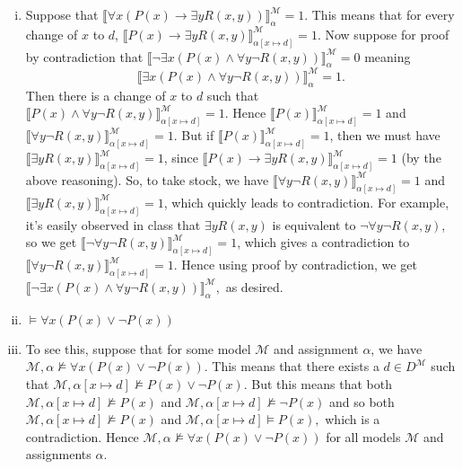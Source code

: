 \begin{enumerate}[\thesection.1]
\begin{enumerate}[(i)]
		\item[] Suppose that $\llbracket \forall x(P(x)\to \exists yR(x,y))\rrbracket^\mathcal{M}_\alpha=1$. This means that for every change of $x$ to $d$, $\llbracket P(x)\to \exists yR(x,y)\rrbracket^\mathcal{M}_{\alpha[x\mapsto d]}=1$. Now suppose for proof by contradiction that $\llbracket\neg \exists x(P(x)\land \forall y\neg R(x,y))\rrbracket^\mathcal{M}_\alpha=0$ meaning  \[\llbracket\exists x(P(x)\land \forall y\neg R(x,y))\rrbracket^\mathcal{M}_\alpha=1.\] Then there is a change of $x$ to $d$ such that $\llbracket P(x)\land \forall y\neg R(x,y)\rrbracket^\mathcal{M}_{\alpha[x\mapsto d]}=1$. Hence $\llbracket P(x)\rrbracket^\mathcal{M}_{\alpha[x\mapsto d]}=1$ and $\llbracket\forall y\neg R(x,y)\rrbracket^\mathcal{M}_{\alpha[x\mapsto d]}=1$. But if $\llbracket P(x)\rrbracket^\mathcal{M}_{\alpha[x\mapsto d]}=1$, then we must have $\llbracket\exists yR(x,y)\rrbracket^\mathcal{M}_{\alpha[x\mapsto d]}=1$, since $\llbracket P(x)\to \exists yR(x,y)\rrbracket^\mathcal{M}_{\alpha[x\mapsto d]}=1$ (by the above reasoning). So, to take stock, we have $\llbracket\forall y\neg R(x,y)\rrbracket^\mathcal{M}_{\alpha[x\mapsto d]}=1$ and $\llbracket \exists yR(x,y)\rrbracket^\mathcal{M}_{\alpha[x\mapsto d]}=1$, which quickly leads to contradiction. For example, it's easily observed in class that $\exists yR(x,y)$ is equivalent to $\neg\forall y\neg R(x,y)$, so we get $\llbracket\neg\forall y\neg R(x,y)\rrbracket^\mathcal{M}_{\alpha[x\mapsto d]}=1$, which gives a contradiction to $\llbracket\forall y\neg R(x,y)\rrbracket^\mathcal{M}_{\alpha[x\mapsto d]}=1$. Hence using proof by contradiction, we get $\llbracket \neg \exists x(P(x)\land \forall y\neg R(x,y))\rrbracket^\mathcal{M}_\alpha,$ as desired.
		
		\item $\vDash \forall x(P(x)\lor \neg P(x))$
		
		\item[] To see this, suppose that for some model $\mathcal{M}$ and assignment $\alpha$, we have $\mathcal{M},\alpha\nvDash  \forall x(P(x)\lor \neg P(x))$. This means that there exists a $d\in D^\mathcal{M}$ such that $\mathcal{M},\alpha[x\mapsto d]\nvDash  P(x)\lor \neg P(x)$. But this means that both $\mathcal{M},\alpha[x\mapsto d]\nvDash  P(x)$ and $\mathcal{M},\alpha[x\mapsto d]\nvDash  \neg P(x)$ and so both $\mathcal{M},\alpha[x\mapsto d]\nvDash  P(x)$ and $\mathcal{M},\alpha[x\mapsto d]\vDash  P(x),$ which is a contradiction. Hence $\mathcal{M},\alpha\nvDash  \forall x(P(x)\lor \neg P(x))$ for all models $\mathcal{M}$ and assignments $\alpha$.
		

\end{enumerate}
\end{enumerate}
